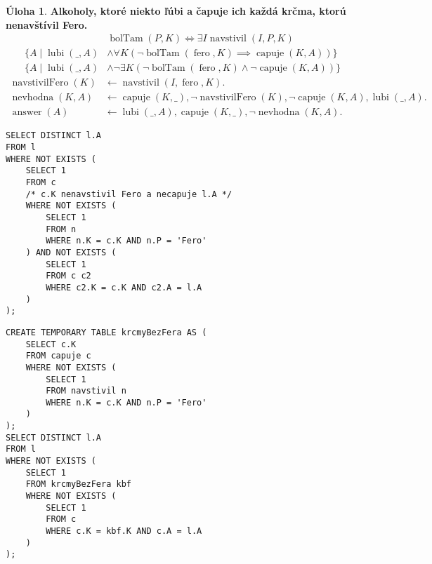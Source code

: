 \documentclass[10pt, a4paper]{article}
\theoremstyle{definition}
\newtheorem{problem}{Úloha}[section]
\DeclareMathOperator{\lubi}{lubi}
\DeclareMathOperator{\capuje}{capuje}
\DeclareMathOperator{\navstivil}{navstivil}
\DeclareMathOperator{\answer}{answer}
\begin{document}
\begin{problem}
{\bf Alkoholy, ktoré niekto ľúbi a čapuje ich každá krčma, ktorú nenavštívil Fero.}
\begin{align*}
& \operatorname{bolTam}(P, K) \Longleftrightarrow \exists I \navstivil(I, P, K)\\
\{A\mid \lubi(\_, A) & \land \forall K (\neg\operatorname{bolTam}(\operatorname{fero}, K)\implies \capuje(K, A))\}\\
\{A\mid \lubi(\_, A) & \land \neg\exists K (\neg\operatorname{bolTam}(\operatorname{fero}, K)\land \neg \capuje(K, A))\}
\end{align*}
\begin{align*}
\operatorname{navstivilFero}(K) &\leftarrow \navstivil(I, \operatorname{fero}, K).\\
\operatorname{nevhodna}(K, A) &\leftarrow \capuje(K, \_), \neg\operatorname{navstivilFero}(K), \neg\capuje(K, A), \lubi(\_, A).\\
\answer(A) &\leftarrow \lubi(\_, A), \capuje(K, \_), \neg\operatorname{nevhodna}(K, A).
\end{align*}

\begin{minipage}[t]{0.49\textwidth}
\small
\begin{verbatim}
SELECT DISTINCT l.A
FROM l
WHERE NOT EXISTS (
    SELECT 1
    FROM c
    /* c.K nenavstivil Fero a necapuje l.A */
    WHERE NOT EXISTS (
        SELECT 1
        FROM n
        WHERE n.K = c.K AND n.P = 'Fero'
    ) AND NOT EXISTS (
        SELECT 1
        FROM c c2
        WHERE c2.K = c.K AND c2.A = l.A
    )
);
\end{verbatim}
\end{minipage}
\begin{minipage}[t]{0.49\textwidth}
\small
\begin{verbatim}
CREATE TEMPORARY TABLE krcmyBezFera AS (
    SELECT c.K
    FROM capuje c
    WHERE NOT EXISTS (
        SELECT 1
        FROM navstivil n
        WHERE n.K = c.K AND n.P = 'Fero'
    )
);
SELECT DISTINCT l.A
FROM l
WHERE NOT EXISTS (
    SELECT 1
    FROM krcmyBezFera kbf
    WHERE NOT EXISTS (
        SELECT 1
        FROM c
        WHERE c.K = kbf.K AND c.A = l.A
    )
);
\end{verbatim}
\end{minipage}
\end{problem}
\end{document}
